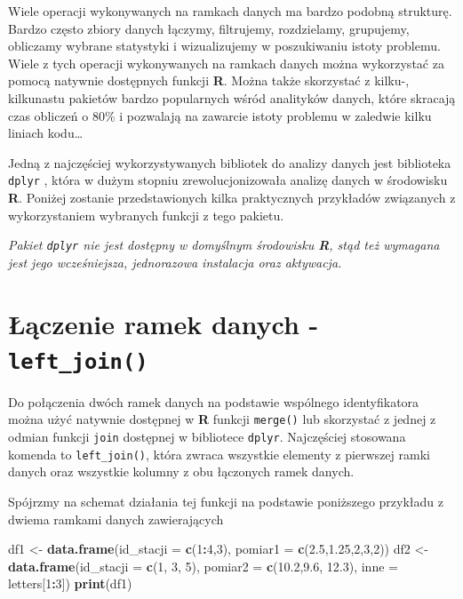 \documentclass[]{book}
\newenvironment{Shaded}{\begin{snugshade}}{\end{snugshade}}
\newcommand{\KeywordTok}[1]{\textcolor[rgb]{0.13,0.29,0.53}{\textbf{#1}}}
\newcommand{\DataTypeTok}[1]{\textcolor[rgb]{0.13,0.29,0.53}{#1}}
\newcommand{\DecValTok}[1]{\textcolor[rgb]{0.00,0.00,0.81}{#1}}
\newcommand{\FloatTok}[1]{\textcolor[rgb]{0.00,0.00,0.81}{#1}}
\newcommand{\StringTok}[1]{\textcolor[rgb]{0.31,0.60,0.02}{#1}}
\newcommand{\OperatorTok}[1]{\textcolor[rgb]{0.81,0.36,0.00}{\textbf{#1}}}
\newcommand{\NormalTok}[1]{#1}
\theoremstyle{definition}
\theoremstyle{definition}
\theoremstyle{definition}
\theoremstyle{remark}
\begin{document}
Wiele operacji wykonywanych na ramkach danych ma bardzo podobną
strukturę. Bardzo często zbiory danych łączymy, filtrujemy, rozdzielamy,
grupujemy, obliczamy wybrane statystyki i wizualizujemy w poszukiwaniu
istoty problemu. Wiele z tych operacji wykonywanych na ramkach danych
można wykorzystać za pomocą natywnie dostępnych funkcji \textbf{R}.
Można także skorzystać z kilku-, kilkunastu pakietów bardzo popularnych
wśród analityków danych, które skracają czas obliczeń o 80\% i pozwalają
na zawarcie istoty problemu w zaledwie kilku liniach kodu\ldots{}

Jedną z najczęściej wykorzystywanych bibliotek do analizy danych jest
biblioteka \texttt{dplyr} \citep{dplyr2016}, która w dużym stopniu
zrewolucjonizowała analizę danych w środowisku \textbf{R}. Poniżej
zostanie przedstawionych kilka praktycznych przykładów związanych z
wykorzystaniem wybranych funkcji z tego pakietu.

\emph{Pakiet \texttt{dplyr} nie jest dostępny w domyślnym środowisku
\textbf{R}, stąd też wymagana jest jego wcześniejsza, jednorazowa
instalacja oraz aktywacja.}

\section{\texorpdfstring{Łączenie ramek danych -
\texttt{left\_join()}}{Łączenie ramek danych - left\_join()}}\label{aczenie-ramek-danych---left_join}

Do połączenia dwóch ramek danych na podstawie wspólnego identyfikatora
można użyć natywnie dostępnej w \textbf{R} funkcji \texttt{merge()} lub
skorzystać z jednej z odmian funkcji \texttt{join} dostępnej w
bibliotece \texttt{dplyr}. Najczęściej stosowana komenda to
\texttt{left\_join()}, która zwraca wszystkie elementy z pierwszej ramki
danych oraz wszystkie kolumny z obu łączonych ramek danych.

Spójrzmy na schemat działania tej funkcji na podstawie poniższego
przykładu z dwiema ramkami danych zawierających

\begin{Shaded}
\begin{Highlighting}[]
\NormalTok{df1 <-}\StringTok{ }\KeywordTok{data.frame}\NormalTok{(}\DataTypeTok{id_stacji =} \KeywordTok{c}\NormalTok{(}\DecValTok{1}\OperatorTok{:}\DecValTok{4}\NormalTok{,}\DecValTok{3}\NormalTok{), }\DataTypeTok{pomiar1 =} \KeywordTok{c}\NormalTok{(}\FloatTok{2.5}\NormalTok{,}\FloatTok{1.25}\NormalTok{,}\DecValTok{2}\NormalTok{,}\DecValTok{3}\NormalTok{,}\DecValTok{2}\NormalTok{))}
\NormalTok{df2 <-}\StringTok{ }\KeywordTok{data.frame}\NormalTok{(}\DataTypeTok{id_stacji =} \KeywordTok{c}\NormalTok{(}\DecValTok{1}\NormalTok{, }\DecValTok{3}\NormalTok{, }\DecValTok{5}\NormalTok{), }\DataTypeTok{pomiar2 =} \KeywordTok{c}\NormalTok{(}\FloatTok{10.2}\NormalTok{,}\FloatTok{9.6}\NormalTok{, }\FloatTok{12.3}\NormalTok{), }\DataTypeTok{inne =}\NormalTok{ letters[}\DecValTok{1}\OperatorTok{:}\DecValTok{3}\NormalTok{])}
\KeywordTok{print}\NormalTok{(df1)}
\end{Highlighting}
\end{Shaded}
\end{document}
